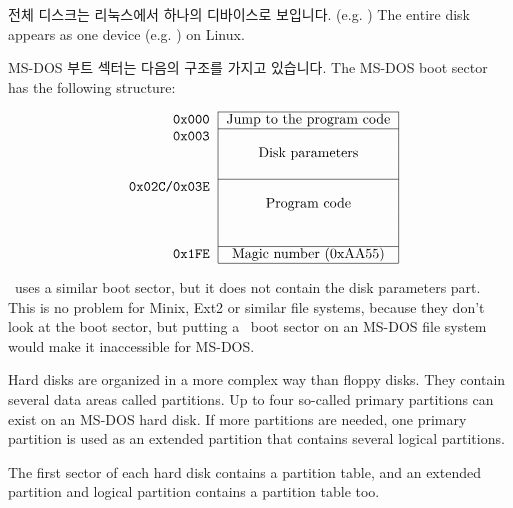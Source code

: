 전체 디스크는 리눅스에서 하나의 디바이스로 보입니다. (e.g. )
The entire disk appears as one device (e.g. ) on Linux.

MS-DOS 부트 섹터는 다음의 구조를 가지고 있습니다.
The MS-DOS boot sector has the following structure:

$$
\begin{tabular}{r|c|}
  \cline{2-2}
  \tt 0x000 & Jump to the program code\\
  \cline{2-2}
  \tt 0x003 & \\
  & Disk parameters \\
  & \\
  \cline{2-2}
  \tt 0x02C/0x03E & \\
  & Program code \\
  & \\
  & \\
  \cline{2-2}
  \tt 0x1FE & Magic number (0xAA55)\\
  \cline{2-2}
\end{tabular}
$$

\LILO\ uses a similar boot sector, but it does not contain the disk
parameters part. This is no problem for Minix, Ext2 or similar file systems,
because
they don't look at the boot sector, but putting a \LILO\ boot sector on an
MS-DOS file system would make it inaccessible for MS-DOS.

Hard disks are organized in a more complex way than floppy disks. They
contain several data areas called partitions. Up to four so-called
primary partitions can exist on an MS-DOS hard disk. If more partitions
are needed, one primary partition is used as an extended partition that
contains several logical partitions.

The first sector of each hard disk contains a partition table, and an
extended partition and  logical partition contains a partition
table too.

